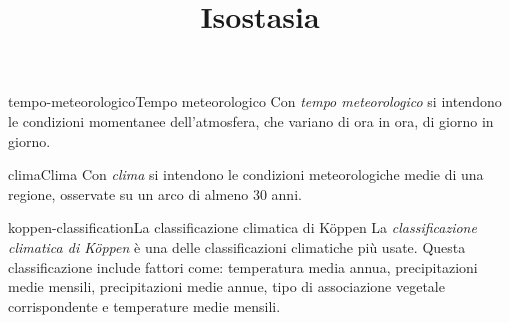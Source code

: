 \documentclass[preview]{standalone}
\begin{document}
\title{Isostasia}
\genpage

\begin{snippetdefinition}{tempo-meteorologico}{Tempo meteorologico}
    Con \textit{tempo meteorologico}
    si intendono le condizioni momentanee
    dell'atmosfera, che variano di ora
    in ora, di giorno in giorno.
\end{snippetdefinition}

\begin{snippetdefinition}{clima}{Clima}
    Con \textit{clima}
    si intendono le condizioni meteorologiche
    medie di una regione, osservate
    su un arco di almeno 30 anni.
\end{snippetdefinition}

\begin{snippetdefinition}{koppen-classification}{La classificazione climatica di Köppen}
    La \textit{classificazione climatica di Köppen} è una delle classificazioni climatiche più usate.
    Questa classificazione include fattori come: temperatura media annua, precipitazioni medie mensili,
    precipitazioni medie annue, tipo di associazione vegetale corrispondente e temperature medie mensili.
\end{snippetdefinition}
\end{document}
